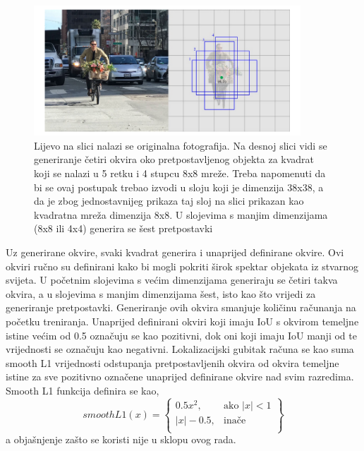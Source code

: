 \begin{figure}[htb]
    \centering
    \includegraphics[width=10cm]{img/SSD-okviri.png}
    \caption{Lijevo na slici nalazi se originalna fotografija. Na desnoj slici vidi se generiranje četiri okvira oko pretpostavljenog objekta za kvadrat koji se 
    nalazi u 5 retku i 4 stupcu 8x8 mreže. Treba napomenuti da bi se ovaj postupak trebao izvodi u sloju koji je dimenzija 38x38, a da je zbog jednostavnijeg prikaza 
    taj sloj na slici prikazan kao kvadratna mreža dimenzija 8x8. U slojevima s manjim dimenzijama (8x8 ili 4x4) generira se šest pretpostavki}
    \label{SSD okvir}
\end{figure}

Uz generirane okvire, svaki kvadrat generira i unaprijed definirane okvire. Ovi okviri ručno su definirani kako bi mogli pokriti širok spektar objekata iz stvarnog svijeta.
U početnim slojevima s većim dimenzijama generiraju se četiri takva okvira, a u slojevima s manjim dimenzijama šest, isto kao što vrijedi za generiranje pretpostavki.
Generiranje ovih okvira smanjuje količinu računanja na početku treniranja.
Unaprijed definirani okviri koji imaju IoU s okvirom temeljne istine većim od 0.5 označuju se kao pozitivni, dok oni koji imaju IoU manji od te vrijednosti se označuju kao negativni.
Lokalizacijski gubitak računa se kao suma smooth L1 vrijednosti odstupanja pretpostavljenih okvira od okvira temeljne istine za sve pozitivno označene unaprijed definirane okvire nad svim razredima. 
Smooth L1 funkcija definira se kao, 
\[
    smoothL1(x) = \left\{\begin{array}{lr}
        0.5x^2, & \text{ako } |x| <  1\\
        |x|- 0.5, & \text{inače } \\
        \end{array}\right\}
\]
a objašnjenje zašto se koristi nije u sklopu ovog rada. \citep{DBLP:journals/corr/LiuAESR15}
